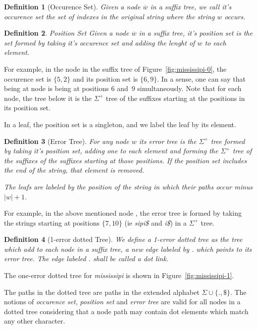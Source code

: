 \documentclass[a4paper,10pt]{article}
\newcommand{\putstring}[1]{\textsl{#1}}
\newtheorem{definition}{Definition}
\begin{document}
\begin{definition}[Occurence Set]
Given a node $\overline{w}$ in a suffix tree, we call it's \emph{occurence set} the set of indexes in the original string where the string $w$ occurs.
\end{definition}

\begin{definition}{Position Set}
Given a node $\overline{w}$ in a suffix tree, it's \emph{position set} is the set formed by taking it's occurence set and adding the lenght of $w$ to each element.
\end{definition}

For example, in the node  in the suffix tree of Figure~\ref{fig:mississipi-0}, the occurence set is $\{5, 2\}$ and its position set is $\{6, 9\}$. In a sense, one can say that being at node  is being at positions 6 and~9 simultaneously. Note that for each node, the tree below it is the $\Sigma^+$ tree of the suffixes starting at the positions in its position set.

In a leaf, the position set is a singleton, and we label the leaf by its element.

\begin{definition}[Error Tree]
For any node $w$ its error tree is the $\Sigma^+$ tree formed by taking it's position set, adding one to each element and forming the $\Sigma^+$ tree of the suffixes of the suffixes starting at those positions. If the position set includes the end of the string, that element is removed.

The leafs are labeled by the position of the string in which their paths occur minus $|w| + 1$.
\end{definition}

For example, in the above mentioned node , the error tree is formed by taking the strings starting at positions $\{7, 10\}$ (ie \putstring{sipi\$} and \putstring{i\$}) in a $\Sigma^+$ tree.

\begin{definition}[1-error dotted Tree]
We define a \emph{1-error dotted tree} as the tree which add to each node in a suffix tree, a new edge labeled by \putstring{.} which points to its error tree. The edge labeled \putstring{.} shall be called a \emph{dot link}.
\end{definition}

The one-error dotted tree for \putstring{mississipi} is shown in Figure~\ref{fig:mississipi-1}.

The paths in the dotted tree are paths in the extended alphabet $\Sigma\cup\{.,\$\}$. The notions of \emph{occurence set}, \emph{position set} and \emph{error tree} are valid for all nodes in a dotted tree considering that a node path may contain dot elements which match any other character.
\end{document}

